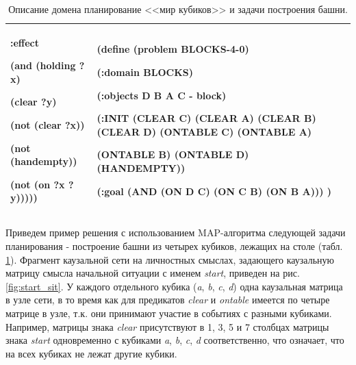 \documentclass[12pt]{report}
\begin{document}
\begin{table}
\begin{tabular}{|p{}|p{}|p{}|}
			:effect
			
			(and (holding ?x)
			
			(clear ?y)
			
			(not (clear ?x))
			
			(not (handempty))
			
			(not (on ?x ?y)))))
			&
			(define (\textbf{problem BLOCKS-4-0})
			
			(:domain BLOCKS)
			
			(:objects D B A C - block)
			
			(:INIT (CLEAR C) (CLEAR A) (CLEAR B) (CLEAR D) (ONTABLE C) (ONTABLE A)
			
			(ONTABLE B) (ONTABLE D) (HANDEMPTY))
			
			(:goal (AND (ON D C) (ON C B) (ON B A)))
			)\\
			\hline
		\end{tabular}
		\caption{Описание домена планирование <<мир кубиков>> и задачи построения башни.}
		\label{tab:domain}
	\end{table}
	
	Приведем пример решения с использованием MAP-алгоритма следующей задачи планирования - построение башни из четырех кубиков, лежащих на столе (табл. \ref{tab:domain}). Фрагмент каузальной сети на личностных смыслах, задающего каузальную матрицу смысла начальной ситуации с именем \textit{start}, приведен на рис. \ref{fig:start_sit}. У каждого отдельного кубика (\textit{a}, \textit{b}, \textit{c}, \textit{d}) одна каузальная матрица в узле сети, в то время как для предикатов \textit{clear} и \textit{ontable} имеется по четыре матрице в узле, т.к. они принимают участие в событиях с разными кубиками. Например, матрицы знака \textit{clear} присутствуют в 1, 3, 5 и 7 столбцах матрицы знака \textit{start} одновременно с кубиками \textit{a}, \textit{b}, \textit{c}, \textit{d} соответственно, что означает, что на всех кубиках не лежат другие кубики.
	
\end{document}
